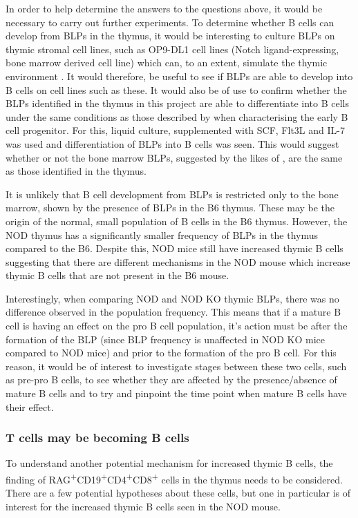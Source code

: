 In order to help determine the answers to the questions above, it would be necessary to carry out further experiments.
To determine whether B cells can develop from BLPs in the thymus, it would be interesting to culture BLPs on thymic stromal cell lines, such as OP9-DL1 cell lines (Notch ligand-expressing, bone marrow derived cell line) which can, to an extent, simulate the thymic environment \citep{Holmes2009}.
It would therefore, be useful to see if BLPs are able to develop into B cells on cell lines such as these.
It would also be of use to confirm whether the BLPs identified in the thymus in this project are able to differentiate into B cells under the same conditions as those described by \citet{Inlay2009} when characterising the early B cell progenitor.
For this, liquid culture, supplemented with SCF, Flt3L and IL-7 was used and differentiation of BLPs into B cells was seen.
This would suggest whether or not the bone marrow BLPs, suggested by the likes of \citet{Inlay2009}, are the same as those identified in the thymus.

It is unlikely that B cell development from BLPs is restricted only to the bone marrow, shown by the presence of BLPs in the B6 thymus.
These may be the origin of the normal, small population of B cells in the B6 thymus.
However, the NOD thymus has a significantly smaller frequency of BLPs in the thymus compared to the B6.
Despite this, NOD mice still have increased thymic B cells suggesting that there are different mechanisms in the NOD mouse which increase thymic B cells that are not present in the B6 mouse.

Interestingly, when comparing NOD and NOD KO thymic BLPs, there was no difference observed in the population frequency.
This means that if a mature B cell is having an effect on the pro B cell population, it's action must be after the formation of the BLP (since BLP frequency is unaffected in NOD KO mice compared to NOD mice) and prior to the formation of the pro B cell.
For this reason, it would be of interest to investigate stages between these two cells, such as pre-pro B cells, to see whether they are affected by the presence/absence of mature B cells and to try and pinpoint the time point when mature B cells have their effect.

\subsubsection{T cells may be becoming B cells}

To understand another potential mechanism for increased thymic B cells, the finding of RAG\textsuperscript{+}CD19\textsuperscript{+}CD4\textsuperscript{+}CD8\textsuperscript{+} cells in the thymus needs to be considered.
There are a few potential hypotheses about these cells, but one in particular is of interest for the increased thymic B cells seen in the NOD mouse.

